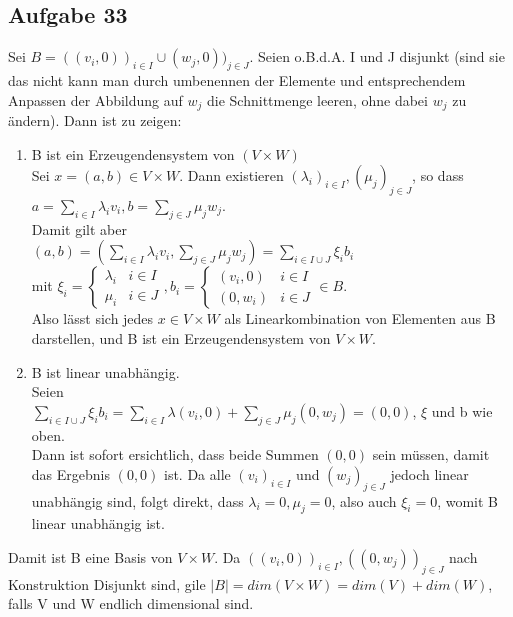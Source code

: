 \documentclass[14pt]{Article}
\begin{document}
\subsection*{Aufgabe 33}
Sei \(B = ((v_i, 0))_{i \in I} \cup (w_j, 0))_{j \in J}\). Seien o.B.d.A. I und J disjunkt (sind sie das nicht kann man durch umbenennen der Elemente und entsprechendem Anpassen der Abbildung auf \(w_j\) die Schnittmenge leeren, ohne dabei \(w_j\) zu \"andern). Dann ist zu zeigen:
\begin{enumerate}
\item{B ist ein Erzeugendensystem von \((V \times W)\)\\
Sei \(x = (a, b) \in V \times W\). Dann existieren \((\lambda_i)_{i\in I}, (\mu_j)_{j \in J}\), so dass\\
\(a = \sum_{i \in I} \lambda_i v_i, b = \sum_{j \in J}\mu_j w_j\).\\
Damit gilt aber\\
\((a, b) = (\sum_{i \in I} \lambda_i v_i, \sum_{j \in J}\mu_j w_j) = \sum_{i \in I \cup J} \xi_i b_i\)\\
mit \(\xi_i = \begin{cases}\lambda_i & i \in I\\\mu_i&i \in J\end{cases}, b_i = \begin{cases}(v_i, 0) & i \in I\\(0, w_i)&i \in J\end{cases} \in B\).\\
Also l\"asst sich jedes \(x \in V \times W\) als Linearkombination von Elementen aus B darstellen, und B ist ein Erzeugendensystem von \(V \times W\).
}
\item{B ist linear unabh\"angig.\\
Seien\\
\(\sum_{i \in I \cup J} \xi_i b_i = \sum_{i \in I} \lambda (v_i, 0) + \sum_{j \in J} \mu_j (0, w_j) = (0, 0)\), \(\xi\) und b wie oben.\\
Dann ist sofort ersichtlich, dass beide Summen \((0, 0)\) sein m\"ussen, damit das Ergebnis \((0, 0)\) ist. Da alle \((v_i)_{i \in I}\) und \((w_j)_{j \in J}\) jedoch linear unabh\"angig sind, folgt direkt, dass \(\lambda_i = 0, \mu_j = 0\), also auch \(\xi_i = 0\), womit B linear unabh\"angig ist.
}
\end{enumerate}
Damit ist B eine Basis von \(V \times W\). Da \(((v_i, 0))_{i \in I}, ((0, w_j))_{j \in J}\) nach Konstruktion Disjunkt sind, gile \(|B| = dim(V \times W) = dim(V) + dim(W)\), falls V und W endlich dimensional sind.
\end{document}
